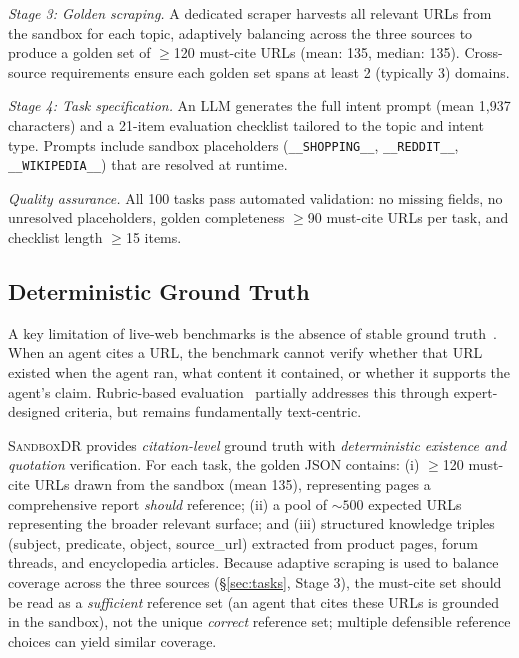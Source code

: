 \documentclass{article}
\newcommand{\ours}{\textsc{SandboxDR}}
\begin{document}
\textit{Stage 3: Golden scraping.} A dedicated scraper harvests all relevant URLs from the sandbox for each topic, adaptively balancing across the three sources to produce a golden set of $\geq$120 must-cite URLs (mean: 135, median: 135). Cross-source requirements ensure each golden set spans at least 2 (typically 3) domains.

\textit{Stage 4: Task specification.} An LLM generates the full intent prompt (mean 1{,}937 characters) and a 21-item evaluation checklist tailored to the topic and intent type. Prompts include sandbox placeholders (\texttt{\_\_SHOPPING\_\_}, \texttt{\_\_REDDIT\_\_}, \texttt{\_\_WIKIPEDIA\_\_}) that are resolved at runtime.

\textit{Quality assurance.} All 100 tasks pass automated validation: no missing fields, no unresolved placeholders, golden completeness $\geq$90 must-cite URLs per task, and checklist length $\geq$15 items.

\subsection{Deterministic Ground Truth}
\label{sec:golden}

A key limitation of live-web benchmarks is the absence of stable ground truth~\citep{browsecomp_plus2025}. When an agent cites a URL, the benchmark cannot verify whether that URL existed when the agent ran, what content it contained, or whether it supports the agent's claim. Rubric-based evaluation~\citep{draco2026,researchrubrics2025} partially addresses this through expert-designed criteria, but remains fundamentally text-centric.

\ours{} provides \emph{citation-level} ground truth with \emph{deterministic existence and quotation} verification. For each task, the golden JSON contains: (i) $\geq$120 must-cite URLs drawn from the sandbox (mean 135), representing pages a comprehensive report \emph{should} reference; (ii) a pool of ${\sim}500$ expected URLs representing the broader relevant surface; and (iii) structured knowledge triples (subject, predicate, object, source\_url) extracted from product pages, forum threads, and encyclopedia articles. Because adaptive scraping is used to balance coverage across the three sources (\S\ref{sec:tasks}, Stage 3), the must-cite set should be read as a \emph{sufficient} reference set (an agent that cites these URLs is grounded in the sandbox), not the unique \emph{correct} reference set; multiple defensible reference choices can yield similar coverage.
\end{document}

